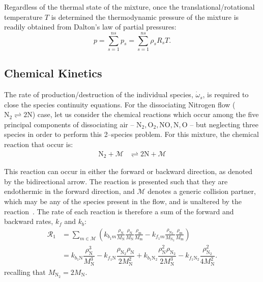 \documentclass[10pt]{article}
\begin{document}
Regardless of the thermal state of the mixture, once the translational/rotational temperature $T$ is determined the thermodynamic pressure of the mixture is readily obtained from Dalton's law of partial pressures:
\begin{equation}
 p = \sum_{s=1}^{ns} p_s = \sum_{s=1}^{ns} \rho_s R_s T .
 \label{eq:p_eq_state}
\end{equation}


\subsection{Chemical Kinetics}
The rate of production/destruction of the individual species, $\dot{\omega}_s$, is required to close the species continuity equations. For the dissociating Nitrogen flow ($  \text{N}_2 \rightleftharpoons 2 \text{N}$) case, let us consider the chemical reactions which occur among the five principal components of dissociating air -- $\text{N}_2,\text{O}_2,\text{NO},\text{N},\text{O}$ -- but neglecting three species in order to perform this 2--species problem. For this mixture, the chemical reaction that occur is:
\begin{align*}
 \text{N}_2 + \mathcal{M} &\rightleftharpoons 2\text{N} + \mathcal{M} 
\end{align*}

This reaction can occur in either the forward or backward direction, as denoted by the bidirectional arrow. The reaction is presented such that they are endothermic in the forward direction, and $\mathcal{M}$ denotes a generic collision partner, which may be any of the species present in the flow, and  is unaltered by the reaction~\citep{Kirk2009}.
The rate of each reaction is therefore a sum of the forward and backward rates,  $k_{f}$ and $k_{b}$:
\begin{align*}
 \mathcal{R}_1 &= \sum_{m\in\mathcal{M}}\left(k_{b_1 m} \frac{\rho_{\text{N}}}{M_{\text{N}}}\frac{\rho_{\text{N}}}{M_{\text{N}}}\frac{\rho_{\text{m}}}{M_{\text{m}}} - k_{f_1 m}\frac{\rho_{\text{N}_2}}{M_{\text{N}_2}}\frac{\rho_{\text{m}}}{M_{\text{m}}} \right) \\
%
&= k_{b_1 \text{N}} \dfrac{\rho_{\text{N}}^3}{M_\text{N}^3} -
k_{f_1 \text{N}}   \dfrac{\rho_{\text{N}_2} \rho_{\text{N}}}{2  M_\text{N}^2}+
k_{b_1 \text{N}_2} \dfrac{\rho_\text{N}^2 \rho_{\text{N}_2}}{2M_\text{N}^3 }-
k_{f_1 \text{N}_2} \dfrac{\rho_{\text{N}_2}^2}{4 M_\text{N}^2}.
\end{align*}
recalling that $M_{\text{N}_2}=2 M_\text{N}.$
\end{document}

